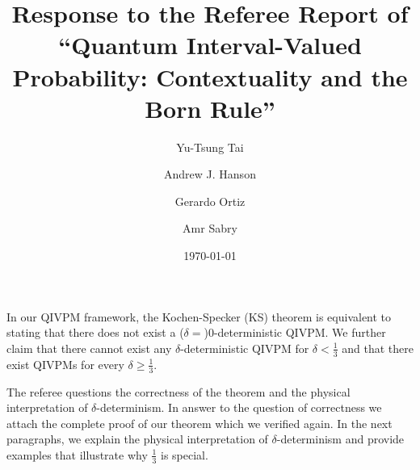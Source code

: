 \documentclass[english,reprint, aps, prl,superscriptaddress, showpacs,
showkeys, longbibliography, amsmath, amssymb, floatfix]{revtex4-1}
\theoremstyle{plain}
\theoremstyle{definition}
\begin{document}
\title{Response to the Referee Report of ``Quantum Interval-Valued Probability:
Contextuality and the Born Rule''}

\author{Yu-Tsung Tai}



\author{Andrew J. Hanson}


\author{Gerardo Ortiz}


\author{Amr Sabry}


\date{\today}

\maketitle

In our QIVPM framework, the Kochen-Specker (KS) theorem is equivalent
to stating that there does not exist a ($\delta=$)$0$-deterministic
QIVPM. We further claim that there cannot exist any $\delta$-deterministic
QIVPM for $\delta<\frac{1}{3}$ and that there exist QIVPMs for every
$\delta\ge\frac{1}{3}$.

The referee questions the correctness of the theorem and the physical
interpretation of $\delta$-determinism. In answer to the question
of correctness we attach the complete proof of our theorem which we
verified again. In the next paragraphs, we explain the physical interpretation
of $\delta$-determinism and provide examples that illustrate why
$\frac{1}{3}$ is special.
\end{document}
